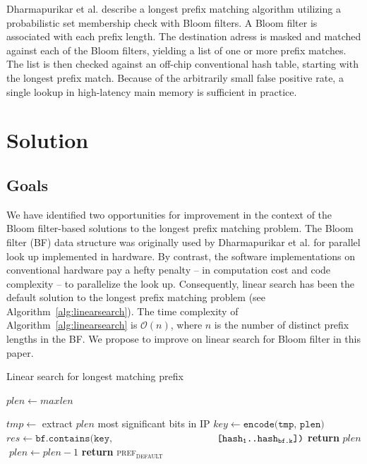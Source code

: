 \documentclass[conference,compsoc]{IEEEtran}
\begin{document}
Dharmapurikar et al.\cite{Dharmapurikar:Bloom} describe a longest prefix
matching algorithm utilizing a probabilistic set membership check with
Bloom filters. A Bloom filter is associated with each prefix length. The
destination adress is masked and matched against each of the Bloom filters,
yielding a list of one or more prefix matches. The list is then checked
against an off-chip conventional hash table, starting with the longest 
prefix match. Because of the arbitrarily small false positive rate, 
a single lookup in high-latency main memory is sufficient in practice.

\section{Solution}

\subsection{Goals}

We have identified two opportunities for improvement in the context of
the Bloom filter-based solutions to the longest prefix matching problem.
The Bloom filter (BF) data structure was originally used by 
Dharmapurikar et al. \cite{Dharmapurikar:Bloom}
for parallel look up implemented in hardware. By contrast, the software
implementations on conventional hardware pay a hefty penalty -- in computation
cost and code complexity -- to parallelize the look up. Consequently, linear
search has been the default solution to the longest prefix matching problem
(see Algorithm~\ref{alg:linearsearch}). The time
complexity of Algorithm~\ref{alg:linearsearch} is $\mathcal{O}(n)$, where $n$
is the number of distinct prefix lengths in the BF. We
propose to improve on linear search for Bloom filter in this paper.

\begin{algorithm}
\caption{Linear search for longest matching prefix}\label{alg:linearsearch}
\begin{algorithmic}[1]
\State $plen \gets maxlen$

  \State $tmp \gets$ extract $plen$ most significant bits in IP
  \State $key \gets \texttt{encode(tmp, plen)}$
  \State $res \gets \texttt{bf.contains(key,}$
                \State $\hspace*{36mm} \texttt{[hash\textsubscript{1}..hash\textsubscript{bf.k}])}$
      \State \textbf{return} $plen$
  \Else
    $\;plen \gets plen - 1$
  \EndIf
\EndWhile
\State \textbf{return} \textsc{pref\textsubscript{default}}
\EndProcedure
\end{algorithmic}
\end{algorithm}
\end{document}
